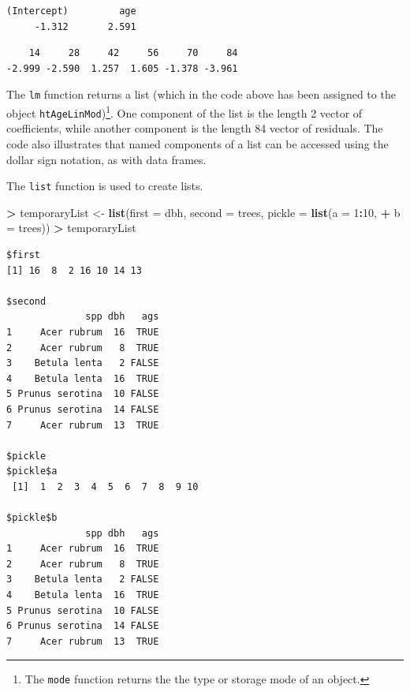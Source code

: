 \documentclass[]{krantz}
\makeatletter
\newenvironment{Shaded}{\begin{snugshade}}{\end{snugshade}}
\newcommand{\DataTypeTok}[1]{\textcolor[rgb]{0.27,0.27,0.27}{#1}}
\newcommand{\DecValTok}[1]{\textcolor[rgb]{0.06,0.06,0.06}{#1}}
\newcommand{\KeywordTok}[1]{\textcolor[rgb]{0.27,0.27,0.27}{\textbf{#1}}}
\newcommand{\NormalTok}[1]{#1}
\newcommand{\OperatorTok}[1]{\textcolor[rgb]{0.43,0.43,0.43}{\textbf{#1}}}
\newcommand{\StringTok}[1]{\textcolor[rgb]{0.5,0.5,0.5}{#1}}
\newenvironment{kframe}{%
\medskip{}
\setlength{\fboxsep}{.8em}
 \def\at@end@of@kframe{}%
 \ifinner\ifhmode%
  \def\at@end@of@kframe{\end{minipage}}%
  \begin{minipage}{\columnwidth}%
 \fi\fi%
 \def\FrameCommand##1{\hskip\@totalleftmargin \hskip-\fboxsep
 \colorbox{shadecolor}{##1}\hskip-\fboxsep
     \hskip-\linewidth \hskip-\@totalleftmargin \hskip\columnwidth}%
 \MakeFramed {\advance\hsize-\width
   \@totalleftmargin\z@ \linewidth\hsize
   \@setminipage}}%
 {\par\unskip\endMakeFramed%
 \at@end@of@kframe}
\renewenvironment{Shaded}{\begin{kframe}}{\end{kframe}}
\makeatother
\begin{document}
\begin{verbatim}
(Intercept)         age 
     -1.312       2.591 
\end{verbatim}

\begin{Shaded}
\end{Shaded}

\begin{verbatim}
    14     28     42     56     70     84 
-2.999 -2.590  1.257  1.605 -1.378 -3.961 
\end{verbatim}

The \texttt{lm} function returns a list (which in the code above has been assigned to the object \texttt{htAgeLinMod})\footnote{The \texttt{mode} function returns the the type or storage mode of an object.}. One component of the list is the length 2 vector of coefficients, while another component is the length 84 vector of residuals. The code also illustrates that named components of a list can be accessed using the dollar sign notation, as with data frames.

The \texttt{list} function is used to create lists.

\begin{Shaded}
\begin{Highlighting}[]
\OperatorTok{>}\StringTok{ }\NormalTok{temporaryList <-}\StringTok{ }\KeywordTok{list}\NormalTok{(}\DataTypeTok{first =}\NormalTok{ dbh, }\DataTypeTok{second =}\NormalTok{ trees, }\DataTypeTok{pickle =} \KeywordTok{list}\NormalTok{(}\DataTypeTok{a =} \DecValTok{1}\OperatorTok{:}\DecValTok{10}\NormalTok{, }
\OperatorTok{+}\StringTok{   }\DataTypeTok{b =}\NormalTok{ trees))}
\OperatorTok{>}\StringTok{ }\NormalTok{temporaryList}
\end{Highlighting}
\end{Shaded}

\begin{verbatim}
$first
[1] 16  8  2 16 10 14 13

$second
              spp dbh   ags
1     Acer rubrum  16  TRUE
2     Acer rubrum   8  TRUE
3    Betula lenta   2 FALSE
4    Betula lenta  16  TRUE
5 Prunus serotina  10 FALSE
6 Prunus serotina  14 FALSE
7     Acer rubrum  13  TRUE

$pickle
$pickle$a
 [1]  1  2  3  4  5  6  7  8  9 10

$pickle$b
              spp dbh   ags
1     Acer rubrum  16  TRUE
2     Acer rubrum   8  TRUE
3    Betula lenta   2 FALSE
4    Betula lenta  16  TRUE
5 Prunus serotina  10 FALSE
6 Prunus serotina  14 FALSE
7     Acer rubrum  13  TRUE
\end{verbatim}
\end{document}
